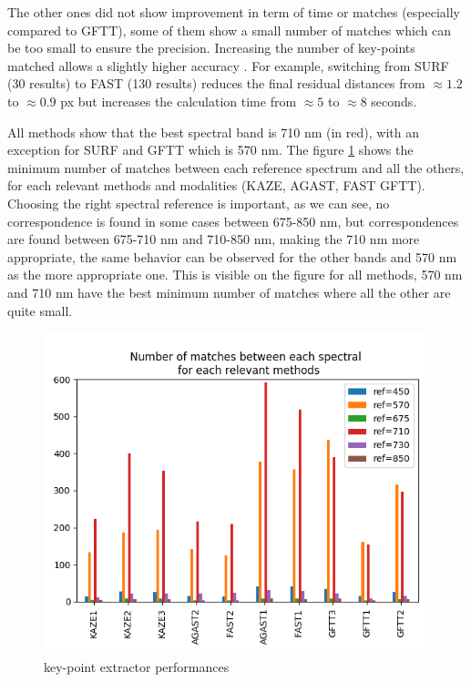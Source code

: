 \documentclass[a4paper,twoside]{article}
\begin{document}
	\noindent
	The other ones did not show improvement in term of time or matches (especially compared to GFTT),
	some of them show a small number of matches which can be too small to ensure the precision.
	Increasing the number of key-points matched allows a slightly higher accuracy \cite{DantasDiasJunior}.
	For example, switching from SURF (30 results) to FAST (130 results) reduces the final residual distances
	from $\approx 1.2$ to $\approx 0.9$ px but increases the calculation time from $\approx 5$ to $\approx 8$ seconds.
	\\
	\par All methods show that the best spectral band is 710 nm (in red), with an exception for SURF and GFTT which is 570 nm.
	The figure \ref{fig:features-GFTT-performances} shows the minimum number of matches between each reference spectrum and all the others, for each relevant methods and modalities (KAZE, AGAST, FAST GFTT).
	Choosing the right spectral reference is important, as we can see, no correspondence is found in some cases between 675-850 nm,
	but correspondences are found between 675-710 nm and 710-850 nm,
	making the 710 nm more appropriate,
	the same behavior can be observed for the other bands and 570 nm as the more appropriate one.
	This is visible on the figure for all methods, 570 nm and 710 nm have the best minimum number of matches where all the other are quite small.
	
	\begin{figure}[h]
		\centering
		\includegraphics[height=0.9\linewidth, angle=90]{../figures/comparaison-keypoint-matching-reference-merged}
		\caption{key-point extractor performances}
		\label{fig:features-GFTT-performances}
	\end{figure}
	
\end{document}
